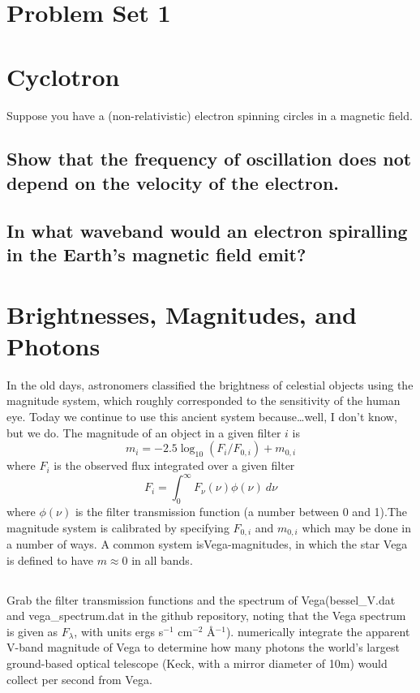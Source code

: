 \documentclass[11pt]{article}
\begin{document}
\pagestyle{empty}
\parindent=0pt

\section*{\centering Problem Set 1}

\section{Cyclotron}

Suppose you have a (non-relativistic) electron spinning circles in a magnetic field.

\subsection{Show that the frequency of oscillation does not depend on the velocity of the electron.}
\vspace{0.25in}
\subsection{In what waveband would an electron spiralling in the Earth's magnetic field emit?}
\vspace{0.25in}

\section{Brightnesses, Magnitudes, and Photons}

In the old days, astronomers classified the brightness of celestial
objects using the magnitude system, which roughly corresponded to the
sensitivity of the human eye. Today we continue to use this ancient system
because\dots well, I don't know, but we do. The magnitude of
an object in a given filter $i$ is
\begin{equation}m_i = −2.5 \log_{10}(F_i/F_{0,i}) + m_{0,i}
\end{equation}
where $F_i$ is the observed flux integrated over a given filter\begin{equation}
F_i = \int_0^\infty{F_\nu(\nu)\phi(\nu)~d\nu}
\end{equation}
where $\phi(\nu)$ is the filter transmission function (a number
between 0 and 1).The magnitude system is calibrated by specifying $F_{0,i}$ and $m_{0,i}$ which
may be done in a number of ways. A common system isVega-magnitudes, in which the star Vega is defined to have $m\approx0$ in all bands.

\subsection{}
Grab the filter transmission functions and the spectrum of Vega(bessel\_V.dat and vega\_spectrum.dat in the github repository, noting that
the Vega spectrum is given as $F_\lambda$, with units ergs s$^{-1}$ cm$^{-2}$ \AA$^{-1}$).
numerically integrate the apparent V-band magnitude of Vega to determine how many
photons the world's largest ground-based optical telescope (Keck, with a mirror diameter of 10m)
would collect per second from Vega.
\end{document}
